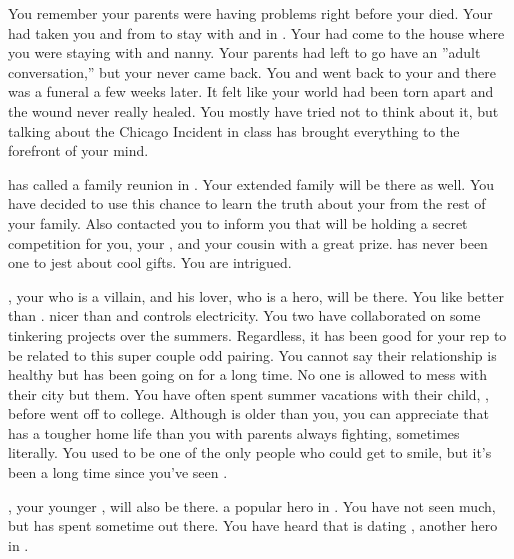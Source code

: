 \documentclass[char]{LRSguildcamp1}
\begin{document}
You remember your parents were having problems right before your \cAS{\parent} died. Your \cAS{\parent} had taken you and \cTween{} from \pCityArchitect{} to stay with \cOS{} and \cGrad{} in \pCityO{}. Your \cArchitect{\parent} had come to the house where you were staying with \cGrad{} and \cGrad{\their} nanny. Your parents had left to go have an ''adult conversation,'' but your \cAS{\parent} never came back. You and \cTween{} went back to your \pCityArchitect{} and there was a funeral a few weeks later. It felt like your world had been torn apart and the wound never really healed. You mostly have tried not to think about it, but talking about the Chicago Incident in class has brought everything to the forefront of your mind.

\cGrandma{} has called a family reunion in \pCityGrandma{}. Your extended family will be there as well. You have decided to use this chance to learn the truth about your \cAS{\parent} from the rest of your family. Also \cGrandma{\they} contacted you to inform you that \cGrandma{\they} will be holding a secret competition for you, your \cTween{\sibling}, and your cousin with a great prize. \cGrandma{} has never been one to jest about cool gifts. You are intrigued.  

\cOldest{}, your \cOldest{\uncle} who is a villain, and his lover, \cOS{} who is a hero, will be there. You like \cOS{} better than \cOldest{}. \cOS{\Theyare} nicer than \cOldest{} and controls electricity. You two have collaborated on some tinkering projects over the summers. Regardless, it has been good for your rep to be related to this super couple odd pairing. You cannot say their relationship is healthy but has been going on for a long time. No one is allowed to mess with their city but them.  You have often spent summer vacations with their child, \cGrad{}, before \cGrad{\they} went off to college. Although \cGrad{} is older than you, you can appreciate that \cGrad{} has a tougher home life than you with parents always fighting, sometimes literally. You used to be one of the only people who could get \cGrad{} to smile, but it's been a long time since you've seen .

\cYoungest{}, your younger \cYoungest{\uncle}, will also be there. \cYoungest{\Theyare} a popular hero in \pCityYoungest{}. You have not seen \cYoungest{\them} much, but \cTween{} has spent sometime out there. You have heard that \cYoungest{} is dating \cYS{}, another hero in \pCityYoungest{}.
\end{document}
